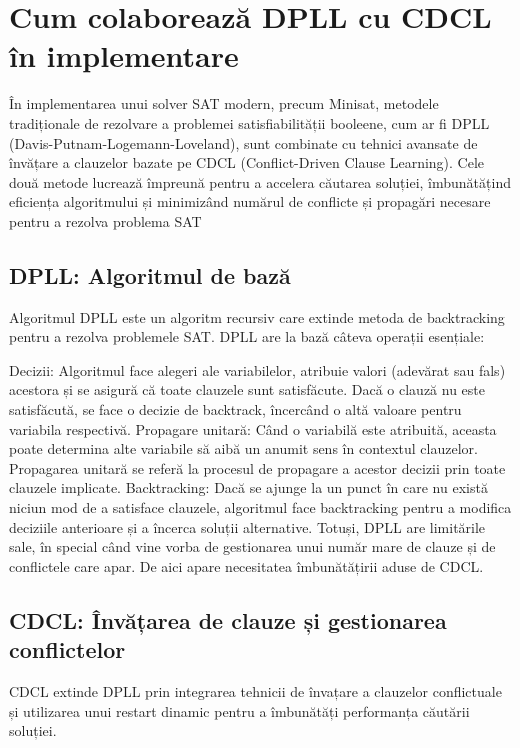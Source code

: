\documentclass[runningheads]{llncs}
\begin{document}
\section{Cum colaborează DPLL cu CDCL în implementare}
În implementarea unui solver SAT modern, precum Minisat, metodele tradiționale de rezolvare a problemei satisfiabilității booleene, cum ar fi DPLL (Davis-Putnam-Logemann-Loveland), sunt combinate cu tehnici avansate de învățare a clauzelor bazate pe CDCL (Conflict-Driven Clause Learning). Cele două metode lucrează împreună pentru a accelera căutarea soluției, îmbunătățind eficiența algoritmului și minimizând numărul de conflicte și propagări necesare pentru a rezolva problema SAT \cite{biere2012conflict}

\subsection{DPLL: Algoritmul de bază}

Algoritmul DPLL este un algoritm recursiv care extinde metoda de backtracking pentru a rezolva problemele SAT. DPLL are la bază câteva operații esențiale:

Decizii: Algoritmul face alegeri ale variabilelor, atribuie valori (adevărat sau fals) acestora și se asigură că toate clauzele sunt satisfăcute. Dacă o clauză nu este satisfăcută, se face o decizie de backtrack, încercând o altă valoare pentru variabila respectivă.
Propagare unitară: Când o variabilă este atribuită, aceasta poate determina alte variabile să aibă un anumit sens în contextul clauzelor. Propagarea unitară se referă la procesul de propagare a acestor decizii prin toate clauzele implicate.
Backtracking: Dacă se ajunge la un punct în care nu există niciun mod de a satisface clauzele, algoritmul face backtracking pentru a modifica deciziile anterioare și a încerca soluții alternative.
Totuși, DPLL are limitările sale, în special când vine vorba de gestionarea unui număr mare de clauze și de conflictele care apar. De aici apare necesitatea îmbunătățirii aduse de CDCL.

\subsection{CDCL: Învățarea de clauze și gestionarea conflictelor}

CDCL extinde DPLL prin integrarea tehnicii de învațare a clauzelor conflictuale și utilizarea unui restart dinamic pentru a îmbunătăți performanța căutării soluției.
\end{document}
